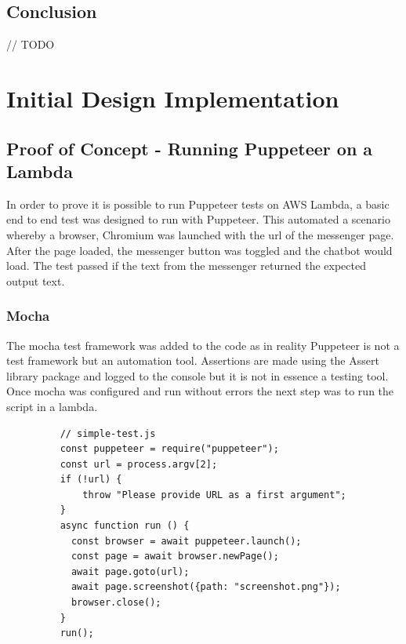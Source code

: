 \documentclass[12pt,a4paper,titlepage]{report}
\begin{document}
\section{Conclusion}
// TODO

\chapter{Initial Design Implementation}

\section{Proof of Concept - Running Puppeteer on a Lambda}

In order to prove it is possible to run Puppeteer tests on AWS Lambda, a basic end to end test was designed
to run with Puppeteer. This automated a scenario whereby a browser, Chromium was launched with the url of the
messenger page. After the page loaded, the messenger button was toggled and the chatbot would load. The test
passed if the text from the messenger returned the expected output text.

\subsection{Mocha}

The mocha test framework was added to the code as in reality Puppeteer is not a test framework but an automation tool.
Assertions are made using the Assert library package and logged to the console but it is not in essence a testing tool.
Once mocha was configured and run without errors the next step was to run the script in a lambda.

\begin{figure}[h]
  \begin{tcolorbox}
    \begin{verbatim}
    // simple-test.js
    const puppeteer = require("puppeteer");
    const url = process.argv[2];
    if (!url) {
        throw "Please provide URL as a first argument";
    }
    async function run () {
      const browser = await puppeteer.launch();
      const page = await browser.newPage();
      await page.goto(url);
      await page.screenshot({path: "screenshot.png"});
      browser.close();
    }
    run();
\end{verbatim}
\end{tcolorbox}
\end{figure}
\end{document}

